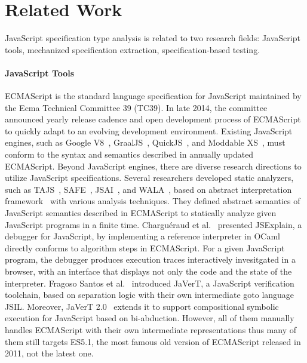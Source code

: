 \section{Related Work}\label{sec:related}

JavaScript specification type analysis is related to two research fields:
JavaScript tools, mechanized specification extraction, specification-based
testing.

\paragraph{JavaScript Tools}
ECMAScript is the standard language specification for JavaScript maintained by
the Ecma Technical Committee 39 (TC39).  In late 2014, the committee announced
yearly release cadence and open development process of ECMAScript to quickly
adapt to an evolving development environment.  Existing JavaScript engines, such
as Google V8~\cite{v8}, GraalJS~\cite{graaljs}, QuickJS~\cite{qjs}, and Moddable
XS~\cite{moddable}, must conform to the syntax and semantics described in
annually updated ECMAScript.  Beyond JavaScript engines, there are diverse
research directions to utilize JavaScript specifications.  Several researchers
developed static analyzers, such as TAJS~\cite{tajs}, SAFE~\cite{safe},
JSAI~\cite{jsai}, and WALA~\cite{wala}, based on abstract interpretation
framework~\cite{ai1977, ai1992} with various analysis techniques.  They defined
abstract semantics of JavaScript semantics described in ECMAScript to statically
analyze given JavaScript programs in a finite time.  Chargu{\'e}raud et
al.~\cite{jsexplain} presented JSExplain, a debugger for JavaScript, by
implementing a reference interpreter in OCaml directly conforms to algorithm
steps in ECMAScript.  For a given JavaScript program, the debugger produces
execution traces interactively invesitgated in a browser, with an interface that
displays not only the code and the state of the interpreter.  Fragoso Santos et
al.~\cite{javert} introduced JaVerT, a JavaScript verification toolchain, based
on separation logic with their own intermediate goto language JSIL.  Moreover,
JaVerT 2.0~\cite{javert2} extends it to support compositional symbolic execution
for JavaScript based on bi-abduction.  However, all of them manually handles
ECMAScript with their own intermediate representations thus many of them still
targets ES5.1, the most famous old version of ECMAScript released in 2011, not
the latest one.

